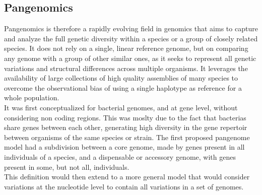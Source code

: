 
\subsection{Pangenomics}
Pangenomics is therefore a rapidly evolving field in genomics that aims to capture and analyze the full genetic diversity within a species or a group of closely related species. It does not rely on a single, linear reference genome, but on comparing any genome with a group of other similar ones, as it seeks to represent all genetic variations and structural differences across multiple organisms. It leverages the availability of large collections of high quality assemblies of many species to overcome the observational bias of using a single haplotype as reference for a whole population.\\
It was first conceptualized for bacterial genomes, and at gene level, without considering non coding regions. This was moslty due to the fact that bacterias share genes between each other, generating high diversity in the gene repertoir between organisms of the same species or strain.
The first proposed pangenome model had a subdivision between a core genome, made by genes present in all individuals of a species, and a dispensable or accessory genome, with genes present in some, but not all, individuals.\\
This definition would then extend to a more general model that would consider variations at the nucleotide level to contain all variations in a set of genomes.\\
